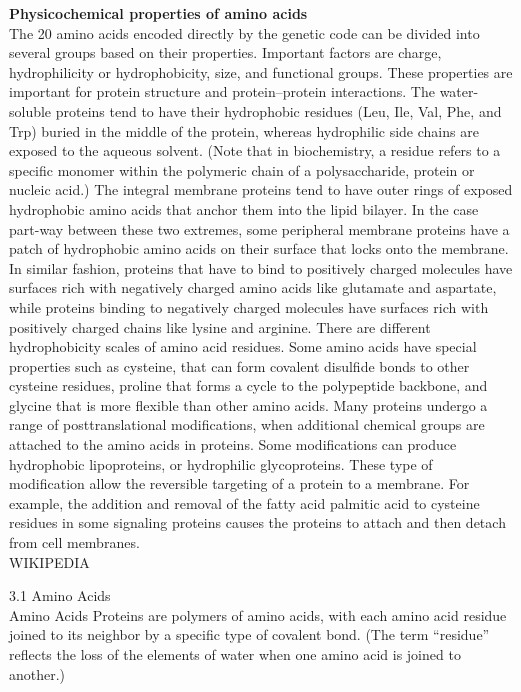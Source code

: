 \textbf{Physicochemical properties of amino acids}\\
The 20 amino acids encoded directly by the genetic code can be divided into several groups based on their properties. Important factors are charge, hydrophilicity or hydrophobicity, size, and functional groups. These properties are important for protein structure and protein–protein interactions. The water-soluble proteins tend to have their hydrophobic residues (Leu, Ile, Val, Phe, and Trp) buried in the middle of the protein, whereas hydrophilic side chains are exposed to the aqueous solvent. (Note that in biochemistry, a residue refers to a specific monomer within the polymeric chain of a polysaccharide, protein or nucleic acid.) The integral membrane proteins tend to have outer rings of exposed hydrophobic amino acids that anchor them into the lipid bilayer. In the case part-way between these two extremes, some peripheral membrane proteins have a patch of hydrophobic amino acids on their surface that locks onto the membrane. In similar fashion, proteins that have to bind to positively charged molecules have surfaces rich with negatively charged amino acids like glutamate and aspartate, while proteins binding to negatively charged molecules have surfaces rich with positively charged chains like lysine and arginine. There are different hydrophobicity scales of amino acid residues.
Some amino acids have special properties such as cysteine, that can form covalent disulfide bonds to other cysteine residues, proline that forms a cycle to the polypeptide backbone, and glycine that is more flexible than other amino acids. 
Many proteins undergo a range of posttranslational modifications, when additional chemical groups are attached to the amino acids in proteins. Some modifications can produce hydrophobic lipoproteins, or hydrophilic glycoproteins. These type of modification allow the reversible targeting of a protein to a membrane. For example, the addition and removal of the fatty acid palmitic acid to cysteine residues in some signaling proteins causes the proteins to attach and then detach from cell membranes.
\\
WIKIPEDIA

3.1 Amino Acids\\
Amino Acids Proteins are polymers of amino acids, with each amino acid residue joined to its neighbor by a specific type of covalent bond. (The term ``residue'' reflects the loss of the elements of water when one amino acid is joined to another.) 

